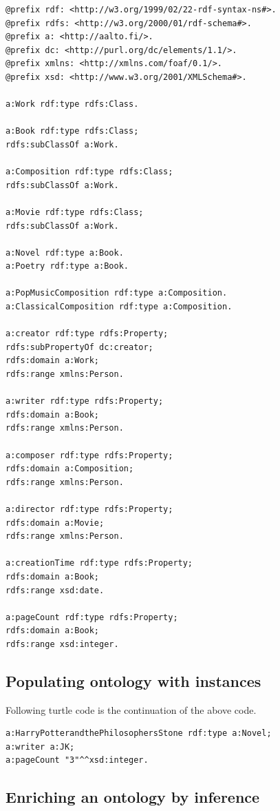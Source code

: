 \documentclass{article}
\begin{document}
\begin{verbatim}
@prefix rdf: <http://w3.org/1999/02/22-rdf-syntax-ns#>.
@prefix rdfs: <http://w3.org/2000/01/rdf-schema#>.
@prefix a: <http://aalto.fi/>.
@prefix dc: <http://purl.org/dc/elements/1.1/>.
@prefix xmlns: <http://xmlns.com/foaf/0.1/>.
@prefix xsd: <http://www.w3.org/2001/XMLSchema#>.

a:Work rdf:type rdfs:Class.

a:Book rdf:type rdfs:Class;
rdfs:subClassOf a:Work.

a:Composition rdf:type rdfs:Class;
rdfs:subClassOf a:Work.

a:Movie rdf:type rdfs:Class;
rdfs:subClassOf a:Work.

a:Novel rdf:type a:Book.
a:Poetry rdf:type a:Book.

a:PopMusicComposition rdf:type a:Composition.
a:ClassicalComposition rdf:type a:Composition.

a:creator rdf:type rdfs:Property;
rdfs:subPropertyOf dc:creator;
rdfs:domain a:Work;
rdfs:range xmlns:Person.

a:writer rdf:type rdfs:Property;
rdfs:domain a:Book;
rdfs:range xmlns:Person.

a:composer rdf:type rdfs:Property;
rdfs:domain a:Composition;
rdfs:range xmlns:Person.

a:director rdf:type rdfs:Property;
rdfs:domain a:Movie;
rdfs:range xmlns:Person.

a:creationTime rdf:type rdfs:Property;
rdfs:domain a:Book;
rdfs:range xsd:date.

a:pageCount rdf:type rdfs:Property;
rdfs:domain a:Book;
rdfs:range xsd:integer.

\end{verbatim}

\subsection{Populating ontology with instances}

Following turtle code is the continuation of the above code.

\begin{verbatim}
a:HarryPotterandthePhilosophersStone rdf:type a:Novel;
a:writer a:JK;
a:pageCount "3"^^xsd:integer.
\end{verbatim}

\subsection{Enriching an ontology by inference}
\end{document}
